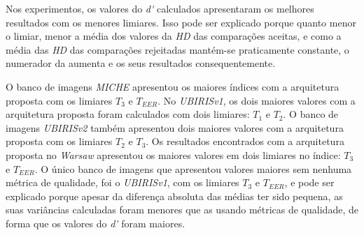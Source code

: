 \par Nos experimentos, os valores do \textit{\acrshort{d'}} calculados apresentaram os melhores resultados com os menores limiares. Isso pode ser explicado porque quanto menor o limiar, menor a média dos valores da \textit{\acrshort{HD}} das comparações aceitas, e como a média das \textit{\acrshort{HD}} das comparações rejeitadas mantém-se praticamente constante, o numerador da  aumenta e os seus resultados consequentemente. 


\par O banco de imagens \textit{MICHE} apresentou os maiores índices com a arquitetura proposta com os limiares $T_{3}$ e $T_{EER}$. No \textit{UBIRISv1}, os dois maiores valores com a arquitetura proposta foram calculados com dois limiares: $T_{1}$ e $T_{2}$. O banco de imagens \textit{UBIRISv2} também apresentou dois maiores valores com a arquitetura proposta com os limiares $T_{2}$ e $T_{3}$. Os resultados encontrados com a arquitetura proposta no \textit{\acrshort{Warsaw}} apresentou os maiores valores em dois limiares no índice: $T_{3}$ e $T_{EER}$. O único banco de imagens que apresentou valores maiores sem nenhuma métrica de qualidade, foi o \textit{UBIRISv1}, com os limiares $T_{3}$ e $T_{EER}$, e pode ser explicado porque apesar da diferença absoluta das médias ter sido pequena, as suas variâncias calculadas foram menores que as usando métricas de qualidade, de forma que os valores do \textit{\acrshort{d'}} foram maiores.



